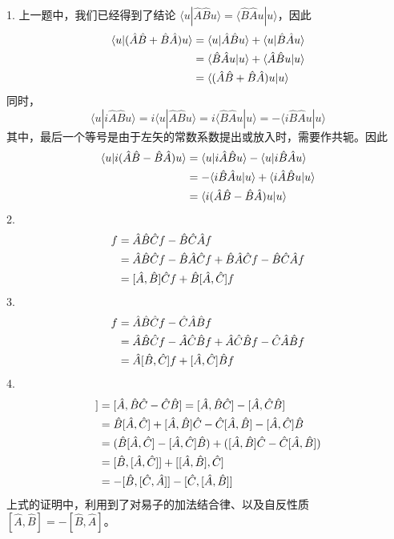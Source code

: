 1. 
上一题中，我们已经得到了结论 $\langle u | \hat A \hat B u \rangle = \langle \hat B \hat A u | u \rangle$，因此
  \begin{align}
    \langle u | (\hat A \hat B + \hat B \hat A) u \rangle
    &= \langle u | \hat A \hat B u \rangle + \langle u | \hat B \hat A u \rangle \notag\\
    &= \langle \hat B \hat A u | u \rangle + \langle \hat A \hat B u | u \rangle \notag\\
    &=  \langle (\hat A \hat B + \hat B \hat A) u | u \rangle
  \end{align}
  同时，
  \begin{equation}
    \langle u | i \hat A \hat B u \rangle
    = i \langle u | \hat A \hat B u \rangle
    = i \langle \hat B \hat A u | u \rangle
    = - \langle i \hat B \hat A u | u \rangle
  \end{equation}
  其中，最后一个等号是由于左矢的常数系数提出或放入时，需要作共轭。因此
  \begin{align}
    \langle u | i (\hat A \hat B - \hat B \hat A) u \rangle
    &= \langle u | i \hat A \hat B u \rangle - \langle u | i \hat B \hat A u \rangle \notag\\
    &= - \langle i \hat B \hat A u | u \rangle + \langle i \hat A \hat B u | u \rangle \notag\\
    &= \langle i (\hat A \hat B - \hat B \hat A) u | u \rangle
  \end{align}
  2.
  \begin{align}
    [\hat A, \hat B \hat C] f
    &= \hat A \hat B \hat C f - \hat B \hat C \hat A f \notag\\
    &= \hat A \hat B \hat C f - \hat B \hat A \hat C f + \hat B \hat A \hat C f - \hat B \hat C \hat A f \notag\\
    &= [\hat A, \hat B] \hat C f + \hat B [\hat A, \hat C] f
  \end{align}
  3.
  \begin{align}
    [\hat A \hat B, \hat C] f
    &= \hat A \hat B \hat C f - \hat C \hat A \hat B f \notag\\
    &= \hat A \hat B \hat C f - \hat A \hat C \hat B f + \hat A \hat C \hat B f - \hat C \hat A \hat B f \notag\\
    &= \hat A [\hat B, \hat C] f + [\hat A, \hat C] \hat B f
  \end{align}
  4.
  \begin{align}
    [\hat A, [\hat B, \hat C]] &= [\hat A, \hat B \hat C - \hat C \hat B] = [\hat A, \hat B \hat C] - [\hat A, \hat C \hat B] \notag\\
    &= \hat B [\hat A, \hat C] + [\hat A, \hat B] \hat C - \hat C [\hat A, \hat B] - [\hat A, \hat C] \hat B \notag\\
    &= (\hat B [\hat A, \hat C] - [\hat A, \hat C] \hat B) + ([\hat A, \hat B] \hat C - \hat C [\hat A, \hat B]) \notag\\
    &= [\hat B, [\hat A, \hat C]] + [[\hat A, \hat B], \hat C] \notag\\
    &= - [\hat B, [\hat C, \hat A]] - [\hat C, [\hat A, \hat B]]
  \end{align}
上式的证明中，利用到了对易子的加法结合律、以及自反性质 $[\hat A, \hat B] = - [\hat B,\hat A]$。


